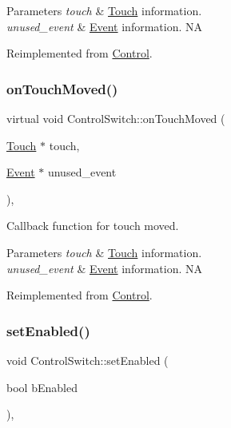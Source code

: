 \begin{DoxyParams}{Parameters}
{\em touch} & \hyperlink{classTouch}{Touch} information. \\
\hline
{\em unused\+\_\+event} & \hyperlink{classEvent}{Event} information.  NA \\
\hline
\end{DoxyParams}


Reimplemented from \hyperlink{classControl_a26d2e6af053319dc605949678f726622}{Control}.

\mbox{\label{classControlSwitch_a74c30d86ef910e4ee32a413153e74042}} 
\subsubsection{\texorpdfstring{on\+Touch\+Moved()}{onTouchMoved()}\hspace{0.1cm}{\footnotesize\ttfamily [2/2]}}
{\footnotesize\ttfamily virtual void Control\+Switch\+::on\+Touch\+Moved (\begin{DoxyParamCaption}\item[{\hyperlink{classTouch}{Touch} $\ast$}]{touch,  }\item[{\hyperlink{classEvent}{Event} $\ast$}]{unused\+\_\+event }\end{DoxyParamCaption})\hspace{0.3cm}{\ttfamily [override]}, {\ttfamily [virtual]}}

Callback function for touch moved.


\begin{DoxyParams}{Parameters}
{\em touch} & \hyperlink{classTouch}{Touch} information. \\
\hline
{\em unused\+\_\+event} & \hyperlink{classEvent}{Event} information.  NA \\
\hline
\end{DoxyParams}


Reimplemented from \hyperlink{classControl_a26d2e6af053319dc605949678f726622}{Control}.

\mbox{\label{classControlSwitch_a6e27f98a50b25ba395f2ad7a5c1aa59f}} 
\subsubsection{\texorpdfstring{set\+Enabled()}{setEnabled()}\hspace{0.1cm}{\footnotesize\ttfamily [1/2]}}
{\footnotesize\ttfamily void Control\+Switch\+::set\+Enabled (\begin{DoxyParamCaption}\item[{bool}]{b\+Enabled }\end{DoxyParamCaption})\hspace{0.3cm}{\ttfamily [override]}, {\ttfamily [virtual]}}

